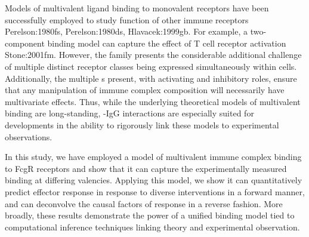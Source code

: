 Models of multivalent ligand binding to monovalent receptors have been successfully employed to study function of other immune receptors \ac{Perelson:1980fs, Perelson:1980ds, Hlavacek:1999gb}. For example, a two-component binding model can capture the effect of T cell receptor activation \ac{Stone:2001fm}. However, the \fcgr{} family presents the considerable additional challenge of multiple distinct receptor classes being expressed simultaneously within cells. Additionally, the multiple \fcgr{}s present, with activating and inhibitory roles, ensure that any manipulation of immune complex composition will necessarily have multivariate effects. Thus, while the underlying theoretical models of multivalent binding are long-standing, \fcgr{}-IgG interactions are especially suited for developments in the ability to rigorously link these models to experimental observations.

In this study, we have employed a model of multivalent immune complex binding to FcgR receptors and show that it can capture the experimentally measured binding at differing valencies. Applying this model, we show it can quantitatively predict effector response in response to diverse interventions in a forward manner, and can deconvolve the causal factors of response in a reverse fashion. More broadly, these results demonstrate the power of a unified binding model tied to computational inference techniques linking theory and experimental observation.
